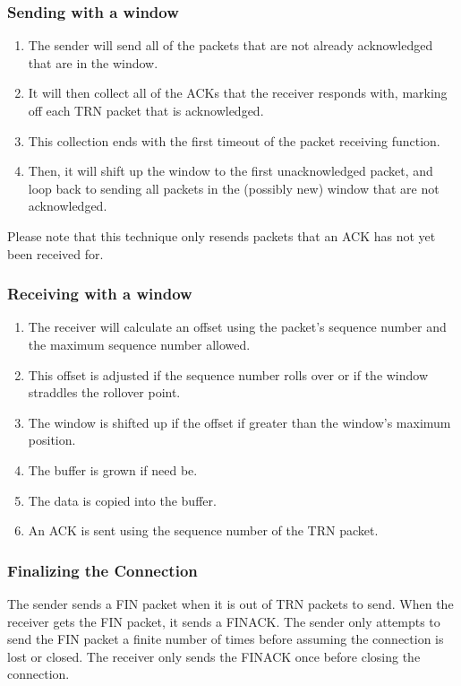 \documentclass[letterpaper,twocolumn,10pt]{article}
\begin{document}
\subsubsection{Sending with a window}
\begin{enumerate}
\item The sender will send all of the packets that are not already acknowledged that are in the window.
\item It will then collect all of the ACKs that the receiver responds with, marking off each TRN packet that is acknowledged.
\item This collection ends with the first timeout of the packet receiving function.
\item Then, it will shift up the window to the first unacknowledged packet, and loop back to sending all packets in the (possibly new) window that are not acknowledged.
\end{enumerate}
Please note that this technique only resends packets that an ACK has not yet been received for.

\subsubsection{Receiving with a window}
\begin{enumerate}
\item The receiver will calculate an offset using the packet's sequence number and the maximum sequence number allowed.
\item This offset is adjusted if the sequence number rolls over or if the window straddles the rollover point.
\item The window is shifted up if the offset if greater than the window's maximum position.
\item The buffer is grown if need be.
\item The data is copied into the buffer.
\item An ACK is sent using the sequence number of the TRN packet.
\end{enumerate}

\subsubsection{Finalizing the Connection}
The sender sends a FIN packet when it is out of TRN packets to send.
When the receiver gets the FIN packet, it sends a FINACK.
The sender only attempts to send the FIN packet a finite number of times before assuming the connection is lost or closed.
The receiver only sends the FINACK once before closing the connection.
\end{document}
